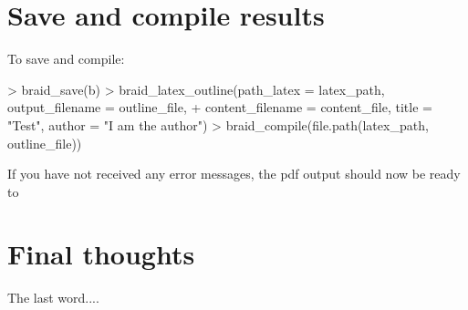 \documentclass[a4paper]{article}
\begin{document}
\section{Save and compile results}

To save and compile:

\begin{Schunk}
\begin{Sinput}
> braid_save(b)
> braid_latex_outline(path_latex = latex_path, output_filename = outline_file, 
+     content_filename = content_file, title = "Test", author = "I am the author")
> braid_compile(file.path(latex_path, outline_file))
\end{Sinput}
\end{Schunk}

If you have not received any error messages, the pdf output should now be ready to 


\section{Final thoughts}

The last word....


\end{document}
